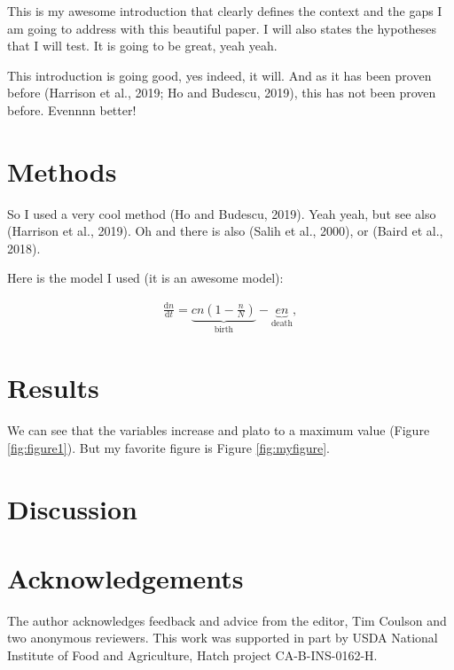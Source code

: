\documentclass[review]{elsarticle} %
\begin{document}
This is my awesome introduction that clearly defines the context and the
gaps I am going to address with this beautiful paper. I will also states
the hypotheses that I will test. It is going to be great, yeah yeah.

This introduction is going good, yes indeed, it will. And as it has been
proven before (Harrison et al., 2019; Ho and Budescu, 2019), this has
not been proven before. Evennnn better!

\newpage

\hypertarget{methods}{%
\section{Methods}\label{methods}}

So I used a very cool method (Ho and Budescu, 2019). Yeah yeah, but see
also (Harrison et al., 2019). Oh and there is also (Salih et al., 2000),
or (Baird et al., 2018).

Here is the model I used (it is an awesome model):

\begin{align}
\frac{\mathrm{d} n}{\mathrm{d} t} = \underbrace{c n \left(1 - \frac{n}{N}\right)}_{\textrm{birth}} - \underbrace{e n}_{\textrm{death}}, \label{levins}
\end{align}

\newpage

\hypertarget{results}{%
\section{Results}\label{results}}

We can see that the variables increase and plato to a maximum value
(Figure \ref{fig:figure1}). But my favorite figure is Figure
\ref{fig:myfigure}.

\hypertarget{discussion}{%
\section{Discussion}\label{discussion}}

\hypertarget{acknowledgements}{%
\section{Acknowledgements}\label{acknowledgements}}

The author acknowledges feedback and advice from the editor, Tim Coulson
and two anonymous reviewers. This work was supported in part by USDA
National Institute of Food and Agriculture, Hatch project
CA-B-INS-0162-H.
\end{document}
